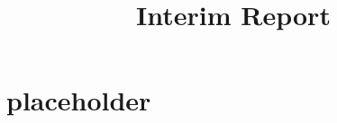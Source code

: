 \documentclass{ContactProject}
\title{Interim Report}
\begin{document}


\maketitle




\clearpage
\tableofcontents
\clearpage















\chapter{placeholder}
\end{document}

